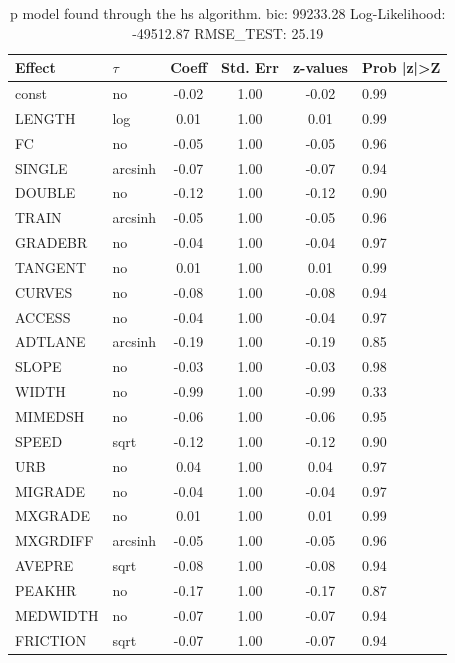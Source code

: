 \begin{table}
	\caption{p model found through the hs algorithm. bic: 99233.28 Log-Likelihood: -49512.87 RMSE_TEST: 25.19}
	\begin{center}
		\begin{tabular}{|l|l|c|c|c|l|}
			\hline
			Effect & $\tau$ & Coeff & Std. Err & z-values & Prob |z|>Z \\
			\hline
			const & no & -0.02 & 1.00 & -0.02 & 0.99 \\
			\hline
			LENGTH & log & 0.01 & 1.00 & 0.01 & 0.99 \\
			\hline
			FC & no & -0.05 & 1.00 & -0.05 & 0.96 \\
			\hline
			SINGLE & arcsinh & -0.07 & 1.00 & -0.07 & 0.94 \\
			\hline
			DOUBLE & no & -0.12 & 1.00 & -0.12 & 0.90 \\
			\hline
			TRAIN & arcsinh & -0.05 & 1.00 & -0.05 & 0.96 \\
			\hline
			GRADEBR & no & -0.04 & 1.00 & -0.04 & 0.97 \\
			\hline
			TANGENT & no & 0.01 & 1.00 & 0.01 & 0.99 \\
			\hline
			CURVES & no & -0.08 & 1.00 & -0.08 & 0.94 \\
			\hline
			ACCESS & no & -0.04 & 1.00 & -0.04 & 0.97 \\
			\hline
			ADTLANE & arcsinh & -0.19 & 1.00 & -0.19 & 0.85 \\
			\hline
			SLOPE & no & -0.03 & 1.00 & -0.03 & 0.98 \\
			\hline
			WIDTH & no & -0.99 & 1.00 & -0.99 & 0.33 \\
			\hline
			MIMEDSH & no & -0.06 & 1.00 & -0.06 & 0.95 \\
			\hline
			SPEED & sqrt & -0.12 & 1.00 & -0.12 & 0.90 \\
			\hline
			URB & no & 0.04 & 1.00 & 0.04 & 0.97 \\
			\hline
			MIGRADE & no & -0.04 & 1.00 & -0.04 & 0.97 \\
			\hline
			MXGRADE & no & 0.01 & 1.00 & 0.01 & 0.99 \\
			\hline
			MXGRDIFF & arcsinh & -0.05 & 1.00 & -0.05 & 0.96 \\
			\hline
			AVEPRE & sqrt & -0.08 & 1.00 & -0.08 & 0.94 \\
			\hline
			PEAKHR & no & -0.17 & 1.00 & -0.17 & 0.87 \\
			\hline
			MEDWIDTH & no & -0.07 & 1.00 & -0.07 & 0.94 \\
			\hline
			FRICTION & sqrt & -0.07 & 1.00 & -0.07 & 0.94 \\

\end{tabular}
\end{center}
\end{table}
